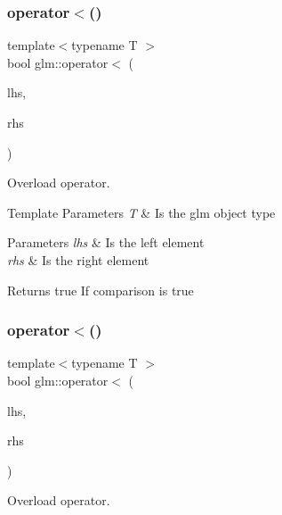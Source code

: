 \subsubsection{\texorpdfstring{operator$<$()}{operator<()}\hspace{0.1cm}{\footnotesize\ttfamily [1/2]}}
{\footnotesize\ttfamily template$<$typename T $>$ \\
bool glm\+::operator$<$ (\begin{DoxyParamCaption}\item[{tvec3$<$ T $>$ const \&}]{lhs,  }\item[{tvec3$<$ T $>$ const \&}]{rhs }\end{DoxyParamCaption})}



Overload operator. 


\begin{DoxyTemplParams}{Template Parameters}
{\em T} & Is the glm object type \\
\hline
\end{DoxyTemplParams}

\begin{DoxyParams}{Parameters}
{\em lhs} & Is the left element \\
\hline
{\em rhs} & Is the right element \\
\hline
\end{DoxyParams}
\begin{DoxyReturn}{Returns}
true If comparison is true 
\end{DoxyReturn}
\mbox{\label{namespaceglm_aaf150b012be57b5af82289ee6976cde6}} 
\subsubsection{\texorpdfstring{operator$<$()}{operator<()}\hspace{0.1cm}{\footnotesize\ttfamily [2/2]}}
{\footnotesize\ttfamily template$<$typename T $>$ \\
bool glm\+::operator$<$ (\begin{DoxyParamCaption}\item[{tvec2$<$ T $>$ const \&}]{lhs,  }\item[{tvec2$<$ T $>$ const \&}]{rhs }\end{DoxyParamCaption})}



Overload operator. 


